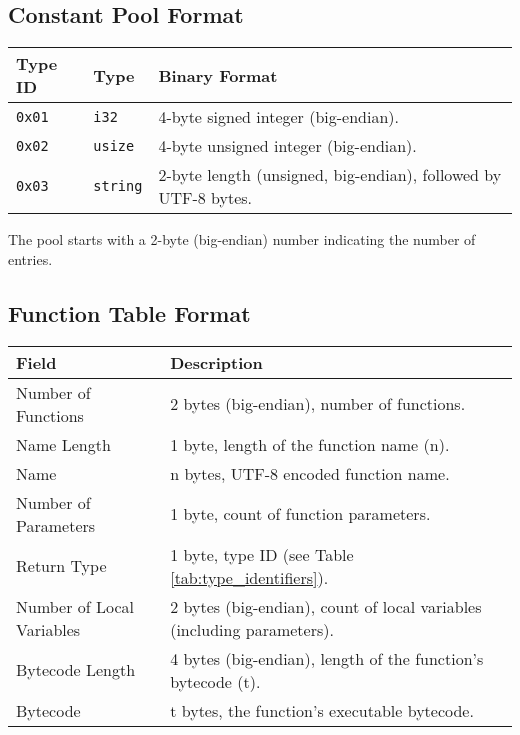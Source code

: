 \documentclass[a4paper,12pt]{article}
\begin{document}
    \subsection{Constant Pool Format}
    \begin{tabular}{|l|l|p{6cm}|}
        \hline
        \textbf{Type ID} & \textbf{Type} & \textbf{Binary Format} \\ \hline
        \texttt{0x01} & \texttt{i32} & 4-byte signed integer (big-endian). \\ \hline
        \texttt{0x02} & \texttt{usize} & 4-byte unsigned integer (big-endian). \\ \hline
        \texttt{0x03} & \texttt{string} & 2-byte length (unsigned, big-endian), followed by UTF-8 bytes. \\ \hline
    \end{tabular}
    \label{tab:constant_pool_format}

    The pool starts with a 2-byte (big-endian) number indicating the number of entries.

    \subsection{Function Table Format}
    \begin{tabular}{|l|p{9cm}|}
        \hline
        \textbf{Field} & \textbf{Description} \\ \hline
        Number of Functions & 2 bytes (big-endian), number of functions. \\ \hline
        Name Length & 1 byte, length of the function name (n). \\ \hline
        Name & n bytes, UTF-8 encoded function name. \\ \hline
        Number of Parameters & 1 byte, count of function parameters. \\ \hline
        Return Type & 1 byte, type ID (see Table \ref{tab:type_identifiers}). \\ \hline
        Number of Local Variables & 2 bytes (big-endian), count of local variables (including parameters). \\ \hline
        Bytecode Length & 4 bytes (big-endian), length of the function's bytecode (t). \\ \hline
        Bytecode & t bytes, the function's executable bytecode. \\ \hline
    \end{tabular}
    \label{tab:function_table_format}
\end{document}
